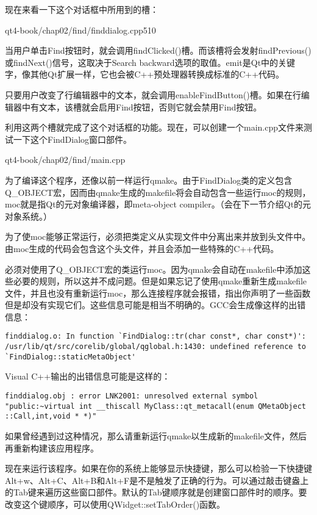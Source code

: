 \documentclass[11pt,oneside]{book}
\begin{document}
\begin{common-format}
现在来看一下这个对话框中所用到的槽：

\begin{cppline}[39]{qt4-book/chap02/find/finddialog.cpp}{51}{0}
\end{cppline}

当用户单击Find按钮时，就会调用findClicked()槽。而该槽将会发射findPrevious()或findNext()信号，这取决于Search backward选项的取值。emit是Qt中的关键字，像其他Qt扩展一样，它也会被C++预处理器转换成标准的C++代码。

只要用户改变了行编辑器中的文本，就会调用enableFindButton()槽。如果在行编辑器中有文本，该槽就会启用Find按钮，否则它就会禁用Find按钮。

利用这两个槽就完成了这个对话框的功能。现在，可以创建一个main.cpp文件来测试一下这个FindDialog窗口部件。

\begin{cppinput}{qt4-book/chap02/find/main.cpp}
\end{cppinput}

为了编译这个程序，还像以前一样运行qmake。由于FindDialog类的定义包含Q\_{}OBJECT宏，因而由qmake生成的makefile将会自动包含一些运行moc的规则，moc就是指Qt的元对象编译器，即meta-object compiler。（会在下一节介绍Qt的元对象系统。）

为了使moc能够正常运行，必须把类定义从实现文件中分离出来并放到头文件中。由moc生成的代码会包含这个头文件，并且会添加一些特殊的C++代码。

必须对使用了Q\_{}OBJECT宏的类运行moc。因为qmake会自动在makefile中添加这些必要的规则，所以这并不成问题。但是如果忘记了使用qmake重新生成makefile文件，并且也没有重新运行moc，那么连接程序就会报错，指出你声明了一些函数但是却没有实现它们。这些信息可能是相当不明确的。GCC会生成像这样的出错信息：
\begin{Verbatim}
finddialog.o: In function `FindDialog::tr(char const*, char const*)':
/usr/lib/qt/src/corelib/global/qglobal.h:1430: undefined reference to
`FindDialog::staticMetaObject'
\end{Verbatim}

Visual C++输出的出错信息可能是这样的：
\begin{Verbatim}
finddialog.obj : error LNK2001: unresolved external symbol
"public:~virtual int __thiscall MyClass::qt_metacall(enum QMetaObject
::Call,int,void * *)"
\end{Verbatim}

如果曾经遇到过这种情况，那么请重新运行qmake以生成新的makefile文件，然后再重新构建该应用程序。

现在来运行该程序。如果在你的系统上能够显示快捷键，那么可以检验一下快捷键Alt+w、Alt+C、Alt+B和Alt+F是不是触发了正确的行为。可以通过敲击键盎上的Tab键来遍历这些窗口部件。默认的Tab键顺序就是创建窗口部件时的顺序。要改变这个键顺序，可以使用QWidget::setTabOrder()函数。


\end{common-format}
\end{document}
